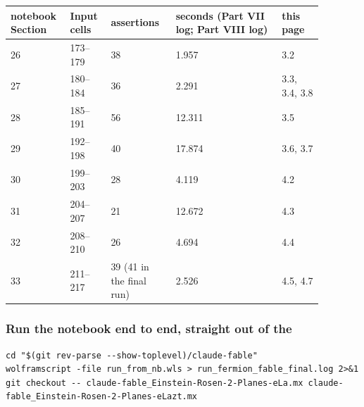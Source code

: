 {\footnotesize
\setlength{\tabcolsep}{3pt}
\begin{longtable}{@{}p{0.133\linewidth}p{0.115\linewidth}p{0.199\linewidth}p{0.310\linewidth}p{0.122\linewidth}@{}}
\toprule
\raggedright notebook Section & \raggedright Input cells & \raggedright assertions & \raggedright seconds (Part VII log; Part VIII log) & \raggedright this page \tabularnewline
\midrule
\endhead
\raggedright 26 & \raggedright 173--179 & \raggedright 38 & \raggedright 1.957 & \raggedright 3.2 \tabularnewline
\raggedright 27 & \raggedright 180--184 & \raggedright 36 & \raggedright 2.291 & \raggedright 3.3, 3.4, 3.8 \tabularnewline
\raggedright 28 & \raggedright 185--191 & \raggedright 56 & \raggedright 12.311 & \raggedright 3.5 \tabularnewline
\raggedright 29 & \raggedright 192--198 & \raggedright 40 & \raggedright 17.874 & \raggedright 3.6, 3.7 \tabularnewline
\raggedright 30 & \raggedright 199--203 & \raggedright 28 & \raggedright 4.119 & \raggedright 4.2 \tabularnewline
\raggedright 31 & \raggedright 204--207 & \raggedright 21 & \raggedright 12.672 & \raggedright 4.3 \tabularnewline
\raggedright 32 & \raggedright 208--210 & \raggedright 26 & \raggedright 4.694 & \raggedright 4.4 \tabularnewline
\raggedright 33 & \raggedright 211--217 & \raggedright 39 (41 in the final run) & \raggedright 2.526 & \raggedright 4.5, 4.7 \tabularnewline
\bottomrule
\end{longtable}
}

\subsubsection{Run the notebook end to end, straight out of the \texorpdfstring{}{.nb}}
\label{sec:6.3.4}

\begin{Verbatim}
cd "$(git rev-parse --show-toplevel)/claude-fable"
wolframscript -file run_from_nb.wls > run_fermion_fable_final.log 2>&1
git checkout -- claude-fable_Einstein-Rosen-2-Planes-eLa.mx claude-fable_Einstein-Rosen-2-Planes-eLazt.mx
\end{Verbatim}

